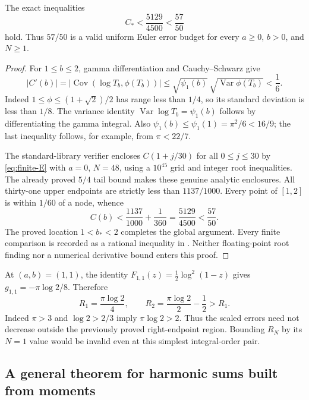 \begin{proposition}\label{prop:rational-budget}
The exact inequalities
\[
 C_*<\frac{5129}{4500}<\frac{57}{50}
\]
hold. Thus $57/50$ is a valid uniform Euler error budget for every
$a\geq0$, $b>0$, and $N\geq1$.
\end{proposition}
\begin{proof}
For $1\leq b\leq2$, gamma differentiation and Cauchy--Schwarz give
\[
 |C'(b)|=|\operatorname{Cov}(\log T_b,\phi(T_b))|
 \leq\sqrt{\psi_1(b)}\,\sqrt{\operatorname{Var}\phi(T_b)}<\frac16.
\]
Indeed $1\leq\phi\leq(1+\sqrt2)/2$ has range less than $1/4$,
so its standard deviation is less than $1/8$. The variance identity
$\operatorname{Var}\log T_b=\psi_1(b)$ follows by differentiating
the gamma integral. Also $\psi_1(b)\leq\psi_1(1)=\pi^2/6<16/9$;
the last inequality follows, for example, from $\pi<22/7$.

The standard-library verifier encloses $C(1+j/30)$ for all
$0\leq j\leq30$ by \eqref{eq:finite-E} with $a=0$, $N=48$,
using a $10^{45}$ grid and integer root inequalities. The already
proved $5/4$ tail bound makes these genuine analytic enclosures.
All thirty-one upper endpoints are strictly less than $1137/1000$.
Every point of $[1,2]$ is within $1/60$ of a node, whence
\[
 C(b)<\frac{1137}{1000}+\frac1{360}=\frac{5129}{4500}
       <\frac{57}{50}.
\]
The proved location $1<b_*<2$ completes the global argument.
Every finite comparison is recorded as a rational inequality in
. Neither floating-point
root finding nor a numerical derivative bound enters this proof.
\end{proof}

\begin{remark}
At $(a,b)=(1,1)$, the identity
$F_{1,1}(z)=\tfrac12\log^2(1-z)$ gives
$g_{1,1}=-\pi\log2/8$. Therefore
\[
 R_1=\frac{\pi\log2}{4},\qquad
 R_2=\frac{\pi\log2}{2}-\frac12>R_1.
\]
Indeed $\pi>3$ and $\log2>2/3$ imply $\pi\log2>2$.
Thus the scaled errors need not decrease outside the previously
proved right-endpoint region. Bounding $R_N$ by its $N=1$ value
would be invalid even at this simplest integral-order pair.
\end{remark}

\subsection{A general theorem for harmonic sums built from moments}


